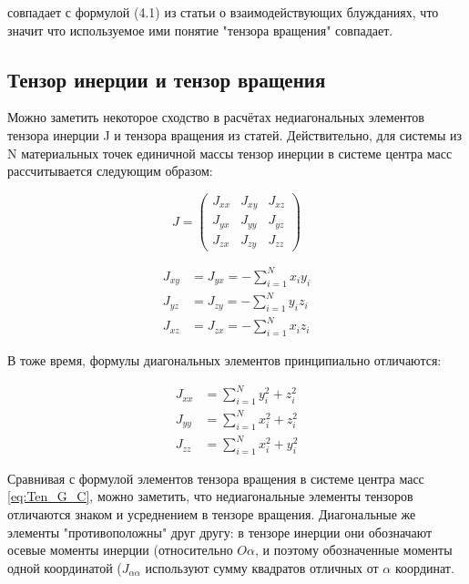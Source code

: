 совпадает с формулой (4.1) из статьи о взаимодействующих блужданиях\cite{Pelissetto}, что значит что используемое ими понятие "тензора вращения" совпадает.

\subsection{Тензор инерции и тензор вращения}

Можно заметить некоторое сходство в расчётах недиагональных элементов тензора инерции J и тензора вращения из статей\cite{Pelissetto, Yanke_G}. Действительно, для системы из N материальных точек единичной массы тензор инерции в системе центра масс рассчитывается следующим образом:

\begin{equation}
    J = \left(
    \begin{array}{ccc}
        J_{xx} & J_{xy} & J_{xz}  \\
        J_{yx} & J_{yy} & J_{yz} \\
        J_{zx} & J_{zy} & J_{zz}
    \end{array} \right)
\end{equation}

\begin{align}
    J_{xy} &= J_{yx} = -\sum_{i=1}^{N} x_{i} y_{i} \\
    J_{yz} &= J_{zy} = -\sum_{i=1}^{N} y_{i} z_{i} \\
    J_{xz} &= J_{zx} = -\sum_{i=1}^{N} x_{i} z_{i} 
\end{align}

В тоже время, формулы диагональных элементов принципиально отличаются:

\begin{align}
    J_{xx} &= \sum_{i=1}^{N} y_{i}^{2} + z_{i}^{2} \\
    J_{yy} &= \sum_{i=1}^{N} x_{i}^{2} + z_{i}^{2} \\
    J_{zz} &= \sum_{i=1}^{N} x_{i}^{2} + y_{i}^{2}
\end{align}

Сравнивая с формулой элементов тензора вращения в системе центра масс \eqref{eq:Ten_G_C}, можно заметить, что недиагональные элементы тензоров отличаются знаком и усреднением в тензоре вращения. Диагональные же элементы "противоположны" друг другу:
в тензоре инерции они обозначают осевые моменты инерции (относительно $O\alpha$, и поэтому обозначенные моменты одной координатой ($J_{\alpha\alpha}$ используют сумму квадратов отличных от $\alpha$ координат.

